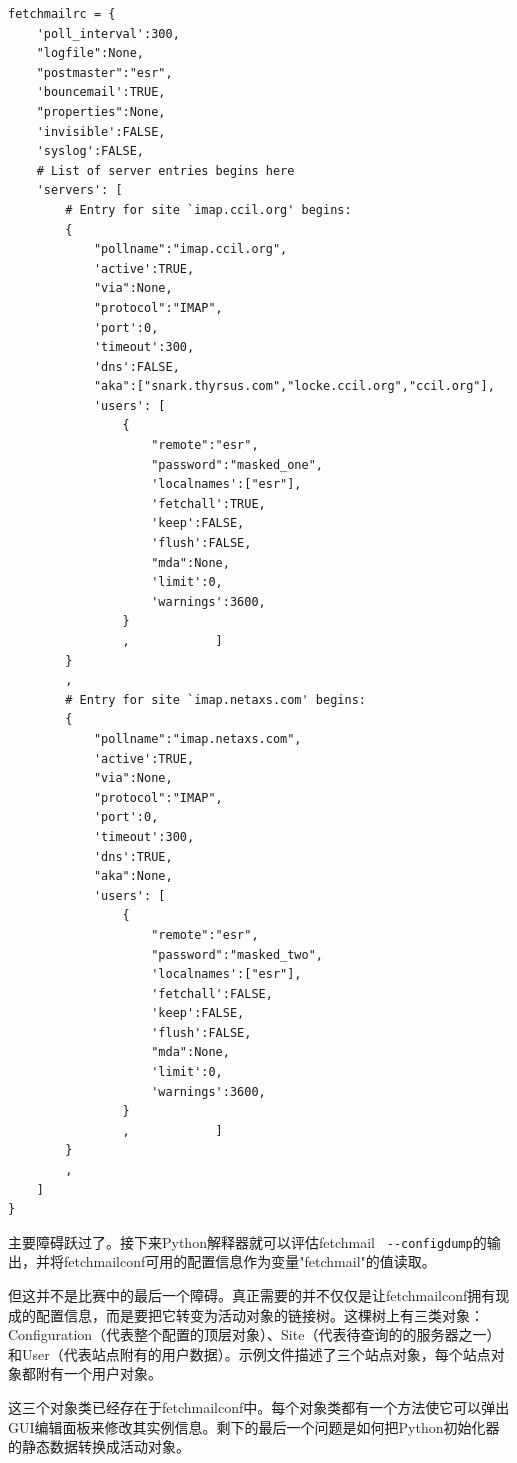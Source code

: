 \documentclass[12pt,oneside]{book}
\begin{document}
\begin{Verbatim}[label=例9.2 fetchmail配置的Python结构转储]
fetchmailrc = {
    'poll_interval':300,
    "logfile":None,
    "postmaster":"esr",
    'bouncemail':TRUE,
    "properties":None,
    'invisible':FALSE,
    'syslog':FALSE,
    # List of server entries begins here
    'servers': [
        # Entry for site `imap.ccil.org' begins:
        {
            "pollname":"imap.ccil.org",
            'active':TRUE,
            "via":None,
            "protocol":"IMAP",
            'port':0,
            'timeout':300,
            'dns':FALSE,
            "aka":["snark.thyrsus.com","locke.ccil.org","ccil.org"],
            'users': [
                {
                    "remote":"esr",
                    "password":"masked_one",
                    'localnames':["esr"],
                    'fetchall':TRUE,
                    'keep':FALSE,
                    'flush':FALSE,
                    "mda":None,
                    'limit':0,
                    'warnings':3600,
                }
                ,            ]
        }
        ,
        # Entry for site `imap.netaxs.com' begins:
        {
            "pollname":"imap.netaxs.com",
            'active':TRUE,
            "via":None,
            "protocol":"IMAP",
            'port':0,
            'timeout':300,
            'dns':TRUE,
            "aka":None,
            'users': [
                {
                    "remote":"esr",
                    "password":"masked_two",
                    'localnames':["esr"],
                    'fetchall':FALSE,
                    'keep':FALSE,
                    'flush':FALSE,
                    "mda":None,
                    'limit':0,
                    'warnings':3600,
                }
                ,            ]
        }
        ,
    ]
}
\end{Verbatim}

主要障碍跃过了。接下来Python解释器就可以评估fetchmail \verb+ --configdump+的输出，并将fetchmailconf可用的配置信息作为变量"fetchmail"的值读取。

但这并不是比赛中的最后一个障碍。真正需要的并不仅仅是让fetchmailconf拥有现成的配置信息，而是要把它转变为活动对象的链接树。这棵树上有三类对象：Configuration（代表整个配置的顶层对象）、Site（代表待查询的的服务器之一）和User（代表站点附有的用户数据）。示例文件描述了三个站点对象，每个站点对象都附有一个用户对象。

这三个对象类已经存在于fetchmailconf中。每个对象类都有一个方法使它可以弹出GUI编辑面板来修改其实例信息。剩下的最后一个问题是如何把Python初始化器的静态数据转换成活动对象。
\end{document}
